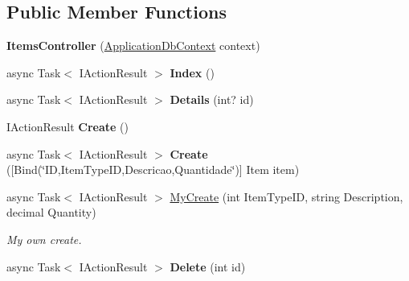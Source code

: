 \subsection*{Public Member Functions}
\begin{DoxyCompactItemize}
\item 
\mbox{\label{class_projeto_e_s_w_1_1_controllers_1_1_items_controller_a9b48b3368758a4a943f6c8a5d6d73da9}} 
{\bfseries Items\+Controller} (\mbox{\hyperlink{class_projeto_e_s_w_1_1_data_1_1_application_db_context}{Application\+Db\+Context}} context)
\item 
\mbox{\label{class_projeto_e_s_w_1_1_controllers_1_1_items_controller_aa609a37037f6c55ef613bd7460be1948}} 
async Task$<$ I\+Action\+Result $>$ {\bfseries Index} ()
\item 
\mbox{\label{class_projeto_e_s_w_1_1_controllers_1_1_items_controller_a7d492d6ee1a5f560d6ed5e72b086baa9}} 
async Task$<$ I\+Action\+Result $>$ {\bfseries Details} (int? id)
\item 
\mbox{\label{class_projeto_e_s_w_1_1_controllers_1_1_items_controller_ac1e7e3b7ce642a43efe2e50914d8fcbb}} 
I\+Action\+Result {\bfseries Create} ()
\item 
\mbox{\label{class_projeto_e_s_w_1_1_controllers_1_1_items_controller_a2f28c4f5906248c24a1a4de15fd15cf6}} 
async Task$<$ I\+Action\+Result $>$ {\bfseries Create} (\mbox{[}Bind(\char`\"{}ID,Item\+Type\+ID,Descricao,Quantidade\char`\"{})\mbox{]} Item item)
\item 
async Task$<$ I\+Action\+Result $>$ \mbox{\hyperlink{class_projeto_e_s_w_1_1_controllers_1_1_items_controller_af64262de25e9bef58abb43e49bf55509}{My\+Create}} (int Item\+Type\+ID, string Description, decimal Quantity)
\begin{DoxyCompactList}\small\item\em My own create.\end{DoxyCompactList}\item 
\mbox{\label{class_projeto_e_s_w_1_1_controllers_1_1_items_controller_ad36485dc01d79498906d888a755c9405}} 
async Task$<$ I\+Action\+Result $>$ {\bfseries Delete} (int id)
\end{DoxyCompactItemize}
